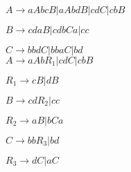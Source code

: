 \begin{question}

    $A \rightarrow aAbcB | aAbdB | cdC | cbB$
    
    $B \rightarrow cdaB | cdbCa | cc$ 

    $C \rightarrow bbdC | bbaC | bd$ \\

    $A \rightarrow aAbR_1 | cdC | cbB$

    $R_1 \rightarrow cB | dB$

    $B \rightarrow cdR_2 | cc$

    $R_2 \rightarrow aB | bCa$

    $C \rightarrow bbR_3 | bd$

    $R_3 \rightarrow dC | aC$

\end{question}
